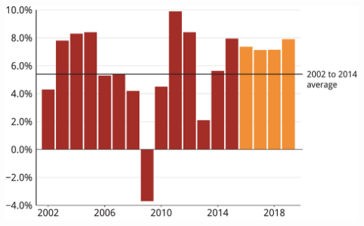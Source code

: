 \documentclass[tikz]{standalone}\usepackage[]{graphicx}\usepackage[]{color}
\newenvironment{knitrout}{}{} %
\begin{document}
\begin{knitrout}
\color{fgcolor}
\includegraphics[width=11.55in,height=7.00in]{./b5-figure/FISCAL-Figure6-1} 

\end{knitrout}
\end{document}
